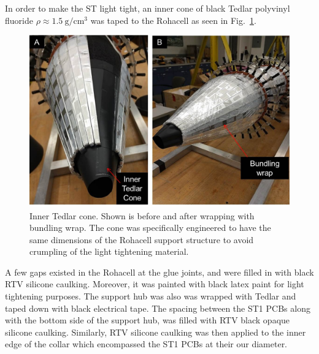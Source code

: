 In order to make the ST light tight, an inner cone of black Tedlar polyvinyl fluoride $\rho \approx 1.5\ \mathrm{g/cm^{3}}$ \cite{tedlar_pvf} was taped to the Rohacell as seen in Fig.~\ref{fig:light_tightening_cone}. 
\begin{figure}[!htb]
	\centering
	\includegraphics[width=1.0\columnwidth]{fabrication/figs/st_lt_ic_bw}
	\caption{Inner Tedlar cone.  Shown is before and after wrapping with bundling wrap.  The cone was specifically engineered to have the same dimensions of the Rohacell support structure to avoid crumpling of the light tightening material.}
	\label{fig:light_tightening_cone}
\end{figure}
A few gaps existed in the Rohacell at the glue joints, and were filled in with black RTV silicone caulking. Moreover, it was painted with black latex paint for light tightening purposes.  The support hub was also was wrapped with Tedlar and taped down with black electrical tape. The spacing between the ST1 PCBs along with the bottom side of the support hub, was filled with RTV black opaque silicone caulking.  Similarly, RTV silicone caulking was then applied to the inner edge of the collar which encompassed the ST1 PCBs at their our diameter.


